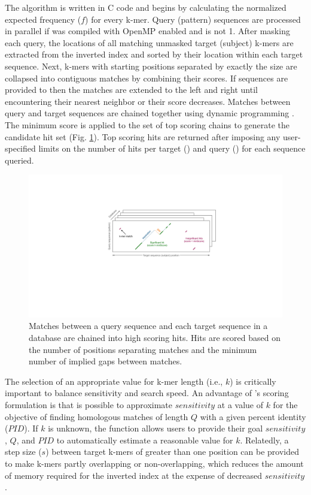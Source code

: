 The  algorithm is written in C code and begins by calculating the normalized expected frequency (\(f\)) for every k-mer. Query (pattern) sequences are processed in parallel if  was compiled with OpenMP enabled and  is not 1. After masking each query, the locations of all matching unmasked target (subject) k-mers are extracted from the inverted index and sorted by their location within each target sequence. Next, k-mers with starting positions separated by exactly the  size are collapsed into contiguous matches by combining their scores. If  sequences are provided to  then the matches are extended to the left and right until encountering their nearest neighbor or their score decreases. Matches between query and target sequences are chained together using dynamic programming \citep{RN4260}. The minimum score is applied to the set of top scoring chains to generate the candidate hit set (Fig. \ref{fig:fig2}). Top scoring hits are returned after imposing any user-specified limits on the number of hits per target () and query () for each sequence queried.

\begin{figure}
\includegraphics[width=1\linewidth]{figures/Fig2} \caption{Matches between a query sequence and each target sequence in a database are chained into high scoring hits. Hits are scored based on the number of positions separating matches and the minimum number of implied gaps between matches.}\label{fig:fig2}
\end{figure}

The selection of an appropriate value for k-mer length (i.e., \(k\)) is critically important to balance sensitivity and search speed. An advantage of 's scoring formulation is that is possible to approximate \(sensitivity\) at a value of \(k\) for the objective of finding homologous matches of length \(Q\) with a given percent identity (\(PID\)). If \(k\) is unknown, the  function allows users to provide their goal \(sensitivity\), \(Q\), and \(PID\) to automatically estimate a reasonable value for \(k\). Relatedly, a step size (\(s\)) between target k-mers of greater than one position can be provided to make k-mers partly overlapping or non-overlapping, which reduces the amount of memory required for the inverted index at the expense of decreased \(sensitivity\).

